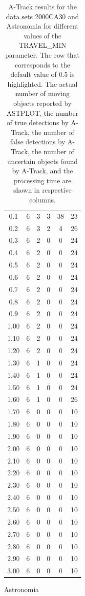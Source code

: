 \documentclass[review]{elsarticle}
\begin{document}
\begin{table}[H]
\begin{subtable}[h]{0.45\textwidth}
{\begin{tabular}{@{}>{\Large}c>{\Large}c>{\Large}c>{\Large}c>{\Large}c>{\Large}c@{}}
		0.1 & 6 & 3 & 3 & 38 & 23 \\
		0.2 & 6 & 3 & 2 & 4 & 26 \\
		0.3 & 6 & 2 & 0 & 0 & 24 \\
		0.4 & 6 & 2 & 0 & 0 & 24 \\
		\rowcolor{LightCyan}
		0.5 & 6 & 2 & 0 & 0 & 24 \\
		0.6 & 6 & 2 & 0 & 0 & 24 \\
		0.7 & 6 & 2 & 0 & 0 & 24 \\
		0.8 & 6 & 2 & 0 & 0 & 24 \\
		0.9 & 6 & 2 & 0 & 0 & 24 \\
		1.00 & 6 & 2 & 0 & 0 & 24 \\
		1.10 & 6 & 2 & 0 & 0 & 24 \\
		1.20 & 6 & 2 & 0 & 0 & 24 \\
		1.30 & 6 & 1 & 0 & 0 & 24 \\
		1.40 & 6 & 1 & 0 & 0 & 24 \\
		1.50 & 6 & 1 & 0 & 0 & 24 \\
		1.60 & 6 & 1 & 0 & 0 & 26 \\
		1.70 & 6 & 0 & 0 & 0 & 10 \\
		1.80 & 6 & 0 & 0 & 0 & 10 \\
		1.90 & 6 & 0 & 0 & 0 & 10 \\
		2.00 & 6 & 0 & 0 & 0 & 10 \\
		2.10 & 6 & 0 & 0 & 0 & 10 \\
		2.20 & 6 & 0 & 0 & 0 & 10 \\
		2.30 & 6 & 0 & 0 & 0 & 10 \\
		2.40 & 6 & 0 & 0 & 0 & 10 \\
		2.50 & 6 & 0 & 0 & 0 & 10 \\
		2.60 & 6 & 0 & 0 & 0 & 10 \\
		2.70 & 6 & 0 & 0 & 0 & 10 \\
		2.80 & 6 & 0 & 0 & 0 & 10 \\
		2.90 & 6 & 0 & 0 & 0 & 10 \\
		3.00 & 6 & 0 & 0 & 0 & 10 \\
        \end{tabular}
        }
        \caption{Astronomia}
        \label{tab:astronomia_travelmin}
    \end{subtable}
    \caption{A-Track results for the data sets 2000CA30 and Astronomia for different values of the TRAVEL\_MIN parameter. The row that corresponds to the default value of 0.5 is highlighted. The actual number of moving objects reported by ASTPLOT, the number of true detections by A-Track, the number of false detections by A-Track, the number of uncertain objects found by A-Track, and the processing time are shown in respective columns.}
    \label{tab:travelmin}
\end{table}
\end{document}

